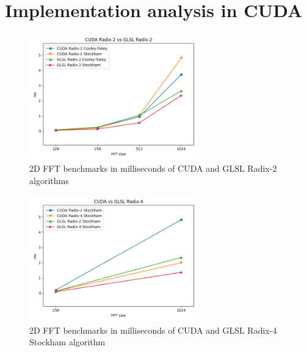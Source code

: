 \documentclass[
  oneside,
  11pt, a4paper,
  footinclude=true,
  headinclude=true,
  cleardoublepage=empty
]{scrbook}
\begin{document}
\section{Implementation analysis in CUDA} \label{sec:implementation-analysis-in-cuda}


\begin{figure}[h] 
    \centering
    \includegraphics[width=0.65\textwidth]{img/results/cuda_vs_glsl_radix2.png}
    \caption{2D FFT benchmarks in milliseconds of CUDA and GLSL Radix-2 algorithms}
    \label{fig:cuda-vs-glsl-radix2}
\end{figure}

\begin{figure}[h] 
    \centering
    \includegraphics[width=0.65\textwidth]{img/results/cuda_vs_glsl_radix4.png}
    \caption{2D FFT benchmarks in milliseconds of CUDA and GLSL Radix-4 Stockham algorithm}
    \label{fig:cuda-vs-glsl-radix4}
\end{figure}

\end{document}
